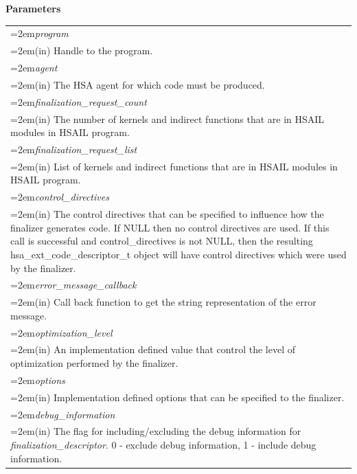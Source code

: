 \documentclass[final]{book}
\newcommand{\hsaarg}[1]{\textit{#1}}
\begin{document}
\noindent\textbf{Parameters}\\[-6mm]
\noindent\begin{longtable}{@{}>{\hangindent=2em}p{\textwidth}}
\hsaarg{program}\\\hspace{2em}(in) Handle to the program.\\[2mm]
\hsaarg{agent}\\\hspace{2em}(in) The HSA agent for which code must be produced.\\[2mm]
\hsaarg{finalization_request_count}\\\hspace{2em}(in) The number of kernels and indirect functions that are in HSAIL modules in HSAIL program.\\[2mm]
\hsaarg{finalization_request_list}\\\hspace{2em}(in) List of kernels and indirect functions that are in HSAIL modules in HSAIL program.\\[2mm]
\hsaarg{control_directives}\\\hspace{2em}(in) The control directives that can be specified to influence how the finalizer generates code. If NULL then no control directives are used. If this call is successful and control_directives is not NULL, then the resulting hsa_ext_code_descriptor_t object will have control directives which were used by the finalizer.\\[2mm]
\hsaarg{error_message_callback}\\\hspace{2em}(in) Call back function to get the string representation of the error message.\\[2mm]
\hsaarg{optimization_level}\\\hspace{2em}(in) An implementation defined value that control the level of optimization performed by the finalizer.\\[2mm]
\hsaarg{options}\\\hspace{2em}(in) Implementation defined options that can be specified to the finalizer.\\[2mm]
\hsaarg{debug_information}\\\hspace{2em}(in) The flag for including/excluding the debug information for \textit{finalization_descriptor}. 0 - exclude debug information, 1 - include debug information.
\end{longtable}
\end{document}
